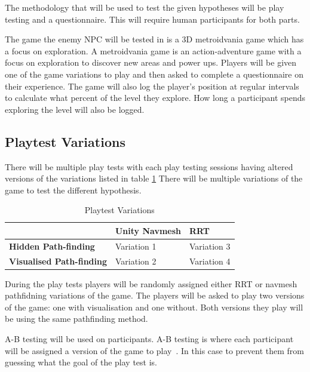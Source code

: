 \documentclass[journal]{IEEEtran}
\begin{document}

The methodology that will be used to test the given hypotheses will be play testing and a questionnaire. This will require human participants for both parts.

The game the enemy NPC will be tested in is a 3D metroidvania game which has a focus on exploration. A metroidvania game is an action-adventure game with a focus on exploration to discover new areas and power ups. Players will be given one of the game variations to play and then asked to complete a questionnaire on their experience. The game will also log the player's position at regular intervals to calculate what percent of the level they explore. How long a participant spends exploring the level will also be logged.

\subsection{Playtest Variations}
There will be multiple play tests with each play testing sessions having altered versions of the variations listed in table \ref{table:PlaytestVariations} 
There will be multiple variations of the game to test the different hypothesis. 


\begin{table}[H]
	\centering
	\caption{Playtest Variations}
	\label{table:PlaytestVariations}
	\def\arraystretch{1.5}
	\begin{tabular}{ |l|l|l|}
		\hline
			  							& \textbf{Unity Navmesh}& \textbf{RRT} \\
		\hline
		\textbf{Hidden Path-finding}	& Variation 1			& Variation 3 \\
		\hline
		\textbf{Visualised Path-finding}& Variation 2		  	& Variation 4 \\
		\hline
	\end{tabular}
\end{table}

During the play tests players will be randomly assigned either RRT or navmesh pathfidning variations of the game. The players will be asked to play two versions of the game: one with visualisation and one without. Both versions they play will be using the same pathfinding method.

A-B testing will be used on participants. A-B testing is where each participant will be assigned a version of the game to play~\cite{Hynninen2014}. In this case to prevent them from guessing what the goal of the play test is. 
\end{document}

